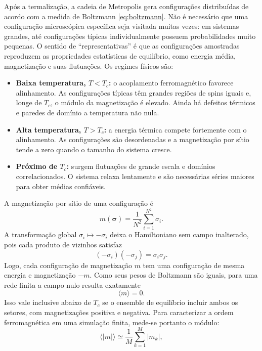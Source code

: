 \documentclass[12pt,a4paper]{article}
\begin{document}
Após a termalização, a cadeia de Metropolis gera configurações distribuídas de acordo com a medida de Boltzmann \eqref{eq:boltzmann}. Não é necessário que uma configuração microscópica específica seja visitada muitas vezes: em sistemas grandes, até configurações típicas individualmente possuem probabilidades muito pequenas. O sentido de ``representativas'' é que as configurações amostradas reproduzem as propriedades estatísticas de equilíbrio, como energia média, magnetização e suas flutuações.
%
Os regimes físicos são:
%
\begin{itemize}
    \item \textbf{Baixa temperatura, $T<T_c$:} o acoplamento ferromagnético favorece alinhamento. As configurações típicas têm grandes regiões de spins iguais e, longe de $T_c$, o módulo da magnetização é elevado. Ainda há defeitos térmicos e paredes de domínio a temperatura não nula.
    \item \textbf{Alta temperatura, $T>T_c$:} a energia térmica compete fortemente com o alinhamento. As configurações são desordenadas e a magnetização por sítio tende a zero quando o tamanho do sistema cresce.
    \item \textbf{Próximo de $T_c$:} surgem flutuações de grande escala e domínios correlacionados. O sistema relaxa lentamente e são necessárias séries maiores para obter médias confiáveis.
\end{itemize}
%
A magnetização por sítio de uma configuração é
%
\begin{equation}
    m(\bm\sigma)=\frac{1}{N^2}\sum_{i=1}^{N^2}\sigma_i.
    \label{eq:magnetizacao}
\end{equation}
%
A transformação global $\sigma_i\mapsto-\sigma_i$ deixa o Hamiltoniano sem campo inalterado, pois cada produto de vizinhos satisfaz
%
\[
    (-\sigma_i)(-\sigma_j)=\sigma_i\sigma_j.
\]
%
Logo, cada configuração de magnetização $m$ tem uma configuração de mesma energia e magnetização $-m$. Como seus pesos de Boltzmann são iguais, para uma rede finita a campo nulo resulta exatamente
%
\begin{equation}
    \langle m\rangle=0.
\end{equation}
%
Isso vale inclusive abaixo de $T_c$ se o ensemble de equilíbrio incluir ambos os setores, com magnetizações positiva e negativa. Para caracterizar a ordem ferromagnética em uma simulação finita, mede-se portanto o módulo:
%
\begin{equation}
    \langle |m|\rangle\simeq\frac{1}{M}\sum_{k=1}^{M}|m_k|,
    \label{eq:media_modulo}
\end{equation}
\end{document}
